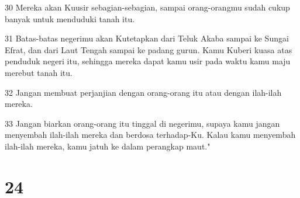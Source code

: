 \par 30 Mereka akan Kuusir sebagian-sebagian, sampai orang-orangmu sudah cukup banyak untuk menduduki tanah itu.
\par 31 Batas-batas negerimu akan Kutetapkan dari Teluk Akaba sampai ke Sungai Efrat, dan dari Laut Tengah sampai ke padang gurun. Kamu Kuberi kuasa atas penduduk negeri itu, sehingga mereka dapat kamu usir pada waktu kamu maju merebut tanah itu.
\par 32 Jangan membuat perjanjian dengan orang-orang itu atau dengan ilah-ilah mereka.
\par 33 Jangan biarkan orang-orang itu tinggal di negerimu, supaya kamu jangan menyembah ilah-ilah mereka dan berdosa terhadap-Ku. Kalau kamu menyembah ilah-ilah mereka, kamu jatuh ke dalam perangkap maut."

\chapter{24}

